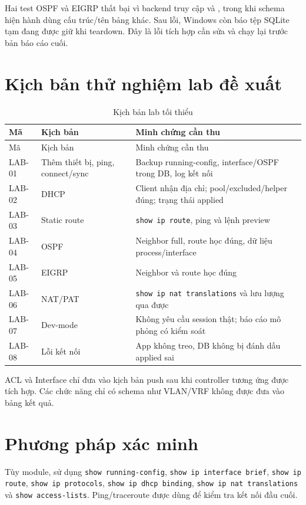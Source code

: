 Hai test OSPF và EIGRP thất bại vì backend truy cập  và , trong khi schema hiện hành dùng cấu trúc/tên bảng khác. Sau lỗi, Windows còn báo tệp SQLite tạm đang được giữ khi teardown. Đây là lỗi tích hợp cần sửa và chạy lại trước bản báo cáo cuối.

\section{Kịch bản thử nghiệm lab đề xuất}

\begin{longtable}{p{}p{}p{}}
\caption{Kịch bản lab tối thiểu}\label{tab:lab-scenarios}\\
\toprule
Mã & Kịch bản & Minh chứng cần thu \\
\midrule
\endfirsthead
\toprule
Mã & Kịch bản & Minh chứng cần thu \\
\midrule
\endhead
LAB-01 & Thêm thiết bị, ping, connect/sync & Backup running-config, interface/OSPF trong DB, log kết nối \\
LAB-02 & DHCP & Client nhận địa chỉ; pool/excluded/helper đúng; trạng thái applied \\
LAB-03 & Static route & \texttt{show ip route}, ping và lệnh preview \\
LAB-04 & OSPF & Neighbor full, route học đúng, dữ liệu process/interface \\
LAB-05 & EIGRP & Neighbor và route học đúng \\
LAB-06 & NAT/PAT & \texttt{show ip nat translations} và lưu lượng qua được \\
LAB-07 & Dev-mode & Không yêu cầu session thật; báo cáo mô phỏng có kiểm soát \\
LAB-08 & Lỗi kết nối & App không treo, DB không bị đánh dấu applied sai \\
\bottomrule
\end{longtable}

ACL và Interface chỉ đưa vào kịch bản push sau khi controller tương ứng được tích hợp. Các chức năng chỉ có schema như VLAN/VRF không được đưa vào bảng kết quả.

\section{Phương pháp xác minh}

Tùy module, sử dụng \texttt{show running-config}, \texttt{show ip interface brief}, \texttt{show ip route}, \texttt{show ip protocols}, \texttt{show ip dhcp binding}, \texttt{show ip nat translations} và \texttt{show access-lists}. Ping/traceroute được dùng để kiểm tra kết nối đầu cuối.

